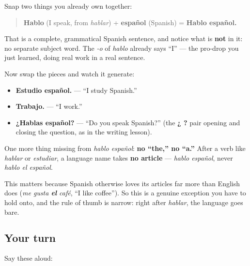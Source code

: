 \begin{grammarlens}[title={What you've built — the sentence assembled}]
Snap two things you already own together:

\begin{quote}
\textbf{Hablo} (I speak, from \emph{hablar}) + \textbf{español} (Spanish) = \textbf{Hablo español.}
\end{quote}

That is a complete, grammatical Spanish sentence, and notice what is \textbf{not} in it: no separate subject word. The \emph{-o} of \emph{hablo} already says \textquotedblleft{}I\textquotedblright{} — the pro-drop you just learned, doing real work in a real sentence.

Now swap the pieces and watch it generate:

\begin{itemize}
\raggedright
  \item \textbf{Estudio español.} — \textquotedblleft{}I study Spanish.\textquotedblright{}
  \item \textbf{Trabajo.} — \textquotedblleft{}I work.\textquotedblright{}
  \item \textbf{¿Hablas español?} — \textquotedblleft{}Do you speak Spanish?\textquotedblright{} (the \textbf{¿ ?} pair opening and closing the question, as in the writing lesson).
\end{itemize}
\end{grammarlens}

\begin{grammarlens}[title={Grammar Lens: languages go bare}]
One more thing missing from \emph{hablo español}: \textbf{no \textquotedblleft{}the,\textquotedblright{} no \textquotedblleft{}a.\textquotedblright{}} After a verb like \emph{hablar} or \emph{estudiar}, a language name takes \textbf{no article} — \emph{hablo español}, never \emph{hablo el español}.

This matters because Spanish otherwise loves its articles far more than English does (\emph{me gusta \textbf{el} café}, \textquotedblleft{}I like coffee\textquotedblright{}). So this is a genuine exception you have to hold onto, and the rule of thumb is narrow: right after \emph{hablar}, the language goes bare.
\end{grammarlens}

\subsection*{Your turn}
Say these aloud:


